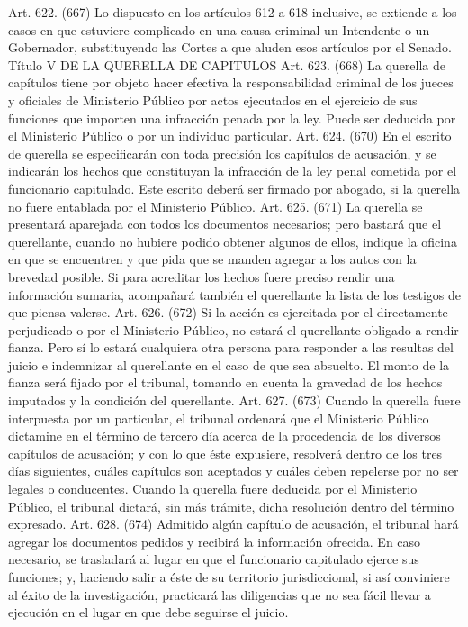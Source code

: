     Art. 622. (667) Lo dispuesto en los artículos 612 a 618 inclusive, se extiende a los casos en que estuviere complicado en una causa criminal un Intendente o un Gobernador, substituyendo las Cortes a que aluden esos artículos por el Senado.
    Título V
    DE LA QUERELLA DE CAPITULOS
    Art. 623. (668) La querella de capítulos tiene por objeto hacer efectiva la responsabilidad criminal de los jueces y oficiales de Ministerio Público por actos ejecutados en el ejercicio de sus funciones que importen una infracción penada por la ley.
    Puede ser deducida por el Ministerio Público o por un individuo particular.
    Art. 624. (670) En el escrito de querella se especificarán con toda precisión los capítulos de acusación, y se indicarán los hechos que constituyan la infracción de la ley penal cometida por el funcionario capitulado. Este escrito deberá ser firmado por abogado, si la querella no fuere entablada por el Ministerio Público.
    Art. 625. (671) La querella se presentará aparejada con todos los documentos necesarios; pero bastará que el querellante, cuando no hubiere podido obtener algunos de ellos, indique la oficina en que se encuentren y que pida que se manden agregar a los autos con la brevedad posible.
    Si para acreditar los hechos fuere preciso rendir una información sumaria, acompañará también el querellante la lista de los testigos de que piensa valerse.
    Art. 626. (672) Si la acción es ejercitada por el directamente perjudicado o por el Ministerio Público, no estará el querellante obligado a rendir fianza.
    Pero sí lo estará cualquiera otra persona para responder a las resultas del juicio e indemnizar al querellante en el caso de que sea absuelto.
    El monto de la fianza será fijado por el tribunal, tomando en cuenta la gravedad de los hechos imputados y la condición del querellante.
    Art. 627. (673) Cuando la querella fuere interpuesta por un particular, el tribunal ordenará que el Ministerio Público dictamine en el término de tercero día acerca de la procedencia de los diversos capítulos de acusación; y con lo que éste expusiere, resolverá dentro de los tres días siguientes, cuáles capítulos son aceptados y cuáles deben repelerse por no ser legales o conducentes.
    Cuando la querella fuere deducida por el Ministerio Público, el tribunal dictará, sin más trámite, dicha resolución dentro del término expresado.
    Art. 628. (674) Admitido algún capítulo de acusación, el tribunal hará agregar los documentos pedidos y recibirá la información ofrecida.
    En caso necesario, se trasladará al lugar en que el funcionario capitulado ejerce sus funciones; y, haciendo salir a éste de su territorio jurisdiccional, si así conviniere al éxito de la investigación, practicará las diligencias que no sea fácil llevar a ejecución en el lugar en que debe seguirse el juicio.
